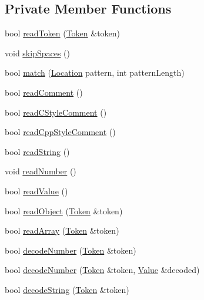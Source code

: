 \subsection*{Private Member Functions}
\begin{DoxyCompactItemize}
\item 
bool \hyperlink{classJson_1_1Reader_a7cb0631963cc0fd4ff6ed0f570976864}{read\+Token} (\hyperlink{classJson_1_1Reader_1_1Token}{Token} \&token)
\item 
void \hyperlink{classJson_1_1Reader_a40d0f69d15aeb2d52ff78d794f5ab8b2}{skip\+Spaces} ()
\item 
bool \hyperlink{classJson_1_1Reader_a3e5a7bc6b7b53f2ca8cb9da42f8ffb21}{match} (\hyperlink{classJson_1_1Reader_a46795b5b272bf79a7730e406cb96375a}{Location} pattern, int pattern\+Length)
\item 
bool \hyperlink{classJson_1_1Reader_ad2690e860a1b3332c5401fb0850ba065}{read\+Comment} ()
\item 
bool \hyperlink{classJson_1_1Reader_ae0ffe796abdc3c5851589ee500e28c79}{read\+C\+Style\+Comment} ()
\item 
bool \hyperlink{classJson_1_1Reader_a6716ef6290b0f469efaf8d379c357967}{read\+Cpp\+Style\+Comment} ()
\item 
bool \hyperlink{classJson_1_1Reader_a6328a0b1994e05118886f9fc9c608643}{read\+String} ()
\item 
void \hyperlink{classJson_1_1Reader_afb31bfda6bb27d6453057a47655e8363}{read\+Number} ()
\item 
bool \hyperlink{classJson_1_1Reader_a47e56844b803d41ec993a83fadf4495c}{read\+Value} ()
\item 
bool \hyperlink{classJson_1_1Reader_a0068eb3d8e86e91f0e4806f60da66b9c}{read\+Object} (\hyperlink{classJson_1_1Reader_1_1Token}{Token} \&token)
\item 
bool \hyperlink{classJson_1_1Reader_afd9a30c0af205c9f327613f486fae6b8}{read\+Array} (\hyperlink{classJson_1_1Reader_1_1Token}{Token} \&token)
\item 
bool \hyperlink{classJson_1_1Reader_a442d1f23edf0f4350f5eeab3ee3f7d46}{decode\+Number} (\hyperlink{classJson_1_1Reader_1_1Token}{Token} \&token)
\item 
bool \hyperlink{classJson_1_1Reader_a72f426ce3fa384d14aa10e9dd75618f0}{decode\+Number} (\hyperlink{classJson_1_1Reader_1_1Token}{Token} \&token, \hyperlink{classJson_1_1Value}{Value} \&decoded)
\item 
bool \hyperlink{classJson_1_1Reader_aaf736937912f5c9b8d221e57f209e3e0}{decode\+String} (\hyperlink{classJson_1_1Reader_1_1Token}{Token} \&token)

\end{DoxyCompactItemize}
